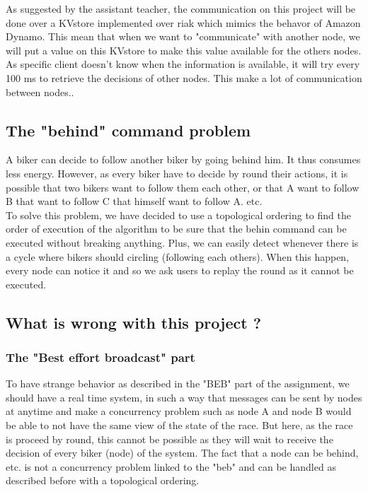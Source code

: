 \documentclass[a4paper, 11pt]{article}
\begin{document}
As suggested by the assistant teacher, the communication on this project will be done over a KVstore implemented over riak which mimics the behavor of Amazon Dynamo. This mean that when we want to "communicate" with another node, we will put a value on this KVstore to make this value available for the others nodes. As specific client doesn't know when the information is available, it will try every 100 ms to retrieve the decisions of other nodes. This make a lot of communication between nodes.. \\

\subsection{The "behind" command problem}

A biker can decide to follow another biker by going behind him. It thus consumes less energy. However, as every biker have to decide by round their actions, it is possible that two bikers want to follow them each other, or that A want to follow B that want to follow C that himself want to follow A. etc. \\

To solve this problem, we have decided to use a topological ordering to find the order of execution of the algorithm to be sure that the behin command can be executed without breaking anything. Plus, we can easily detect whenever there is a cycle where bikers should circling (following each others). When this happen, every node can notice it and so we ask users to replay the round as it cannot be executed. \\

\subsection{What is wrong with this project ?}

\subsubsection{The "Best effort broadcast" part}
To have strange behavior as described in the "BEB" part of the assignment, we should have a real time system, in such a way that messages can be sent by nodes at anytime and make a concurrency problem such as node A and node B would be able to not have the same view of the state of the race. But here, as the race is proceed by round, this cannot be possible as they will wait to receive the decision of every biker (node) of the system. The fact that a node can be behind, etc. is not a concurrency problem linked to the "beb" and can be handled as described before with a topological ordering.
\end{document}
